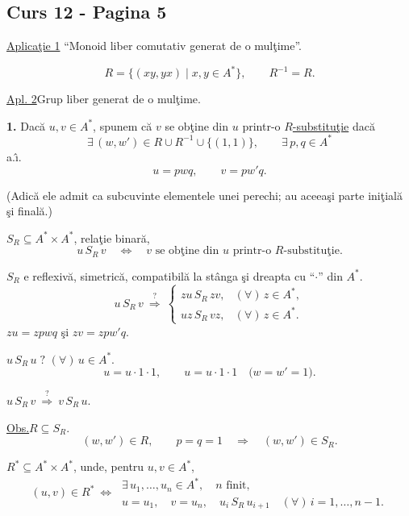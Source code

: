 
\subsection*{Curs 12 - Pagina 5}

\noindent\underline{Aplica\c{t}ie 1}\quad
``Monoid liber comutativ generat de o mul\c{t}ime''.

\[
R=\bigl\{(xy,yx)\mid x,y\in A^*\bigr\},\qquad R^{-1}=R.
\]

\medskip
\noindent\underline{Apl. 2}\quad Grup liber generat de o mul\c{t}ime.

\bigskip
\noindent\textbf{1.} Dac\u{a} $u,v\in A^*$, spunem c\u{a} $v$ se ob\c{t}ine
 din $u$ printr-o \underline{$R$-substitu\c{t}ie} dac\u{a}
\[
\exists\,(w,w')\in R\cup R^{-1}\cup\{(1,1)\},
\qquad \exists\,p,q\in A^*
\]
\noindent a.\^{\i}. 
\[
u=pwq,\qquad v=pw'q.
\]

\noindent (Adic\u{a} ele admit ca subcuvinte elementele unei perechi;
 au aceea\c{s}i parte ini\c{t}ial\u{a} \c{s}i final\u{a}.)

\bigskip
\noindent $S_R\subseteq A^*\times A^*$, rela\c{t}ie binar\u{a},
\[
u\,S_R\,v\quad\Longleftrightarrow\quad
v\text{ se ob\c{t}ine din }u\text{ printr-o }R\text{-substitu\c{t}ie}.
\]

\noindent $S_R$ e reflexiv\u{a}, simetric\u{a}, compatibil\u{a} la
 st\^{a}nga \c{s}i dreapta cu ``$\cdot$'' din $A^*$.
\[
u\,S_R\,v\ \overset{?}{\Longrightarrow}\
\begin{cases}
zu\,S_R\,zv, & (\forall)\,z\in A^*,\\
uz\,S_R\,vz, & (\forall)\,z\in A^*.
\end{cases}
\]
\noindent $zu=zpwq$ \c{s}i $zv=zpw'q$.

\medskip
\noindent $u\,S_R\,u\;?$ \quad $(\forall)\,u\in A^*$.
\[
u=u\cdot1\cdot1,\qquad u=u\cdot1\cdot1
\quad\bigl(w=w'=1\bigr).
\]

\noindent $u\,S_R\,v\ \overset{?}{\Longrightarrow}\ v\,S_R\,u$.

\bigskip
\noindent\underline{Obs.}\quad $R\subseteq S_R$.
\[
(w,w')\in R,\qquad p=q=1
\quad\Longrightarrow\quad (w,w')\in S_R.
\]

\bigskip
\noindent $R^*\subseteq A^*\times A^*$, unde, pentru $u,v\in A^*$,
\[
(u,v)\in R^*\ \Longleftrightarrow\
\begin{gathered}
\exists\,u_1,\ldots,u_n\in A^*,\quad n\text{ finit},\\
u=u_1,\quad v=u_n,\quad
u_i\,S_R\,u_{i+1}\quad (\forall)\,i=1,\ldots,n-1.
\end{gathered}
\]

